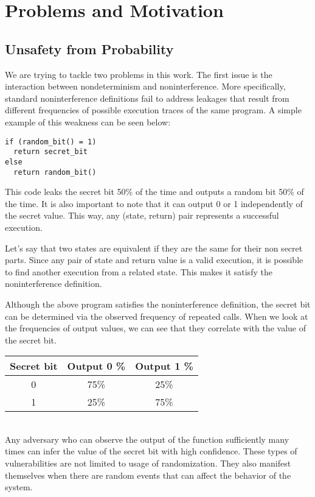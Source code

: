 
\section{Problems and Motivation}
\subsection{Unsafety from Probability}
We are trying to tackle two problems in this work. The first issue is the interaction between nondeterminism and noninterference. More specifically, standard noninterference definitions fail to address leakages that result from different frequencies of possible execution traces of the same program. A simple example of this weakness can be seen below: 

\begin{lstlisting}
if (random_bit() = 1)
  return secret_bit
else
  return random_bit()
\end{lstlisting}

This code leaks the secret bit 50\% of the time and outputs a random bit 50\% of the time. It is also important to note that it can output 0 or 1 independently of the secret value. This way, any (state, return) pair represents a successful execution. 

Let’s say that two states are equivalent if they are the same for their non secret parts. Since any pair of state and return value is a valid execution, it is possible to find another execution from a related state. This makes it satisfy the noninterference definition. 

Although the above program satisfies the noninterference definition, the secret bit can be determined via the observed frequency of repeated calls. When we look at the frequencies of output values, we can see that they correlate with the value of the secret bit. \\

\begin{tabular}{| c | c | c |}
	\hline
	Secret bit & Output 0 \% & Output 1 \% \\
	\hline
	0 &	75\% & 25\% \\
	\hline
	1 &	25\% & 75\% \\
	\hline
\end{tabular}\\

Any adversary who can observe the output of the function sufficiently many times can infer the value of the secret bit with high confidence. These types of vulnerabilities are not limited to usage of randomization. They also manifest themselves when there are random events that can affect the behavior of the system.
 
